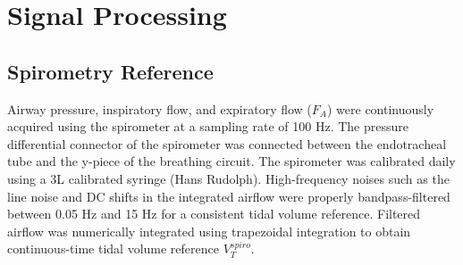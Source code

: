 \documentclass[journal,twoside,web]{ieeecolor}
\begin{document}
\section{Signal Processing}
\subsection{Spirometry Reference}
Airway pressure, inspiratory flow, and expiratory flow ($F_A$) were continuously acquired using the spirometer at a sampling rate of 100 Hz. The pressure differential connector of the spirometer was connected between the endotracheal tube and the y-piece of the breathing circuit. The spirometer was calibrated daily using a 3L calibrated syringe (Hans Rudolph). High-frequency noises such as the line noise and DC shifts in the integrated airflow were properly bandpass-filtered between 0.05 Hz and 15 Hz for a consistent tidal volume reference. Filtered airflow was numerically integrated using trapezoidal integration to obtain continuous-time tidal volume reference $V^{spiro}_T$. 
\end{document}
